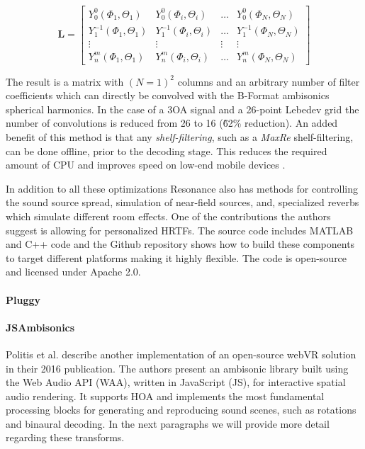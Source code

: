 \begin{equation}
\mathbf{L}=\left[\begin{array}{cccc}
Y_{0}^{0}\left(\Phi_{1}, \Theta_{1}\right) & Y_{0}^{0}\left(\Phi_{i}, \Theta_{i}\right) & \ldots & Y_{0}^{0}\left(\Phi_{N}, \Theta_{N}\right) \\
Y_{1}^{-1}\left(\Phi_{1}, \Theta_{1}\right) & Y_{1}^{-1}\left(\Phi_{i}, \Theta_{i}\right) & \ldots & Y_{1}^{-1}\left(\Phi_{N}, \Theta_{N}\right) \\
\vdots & \vdots & \vdots & \vdots \\
Y_{n}^{m}\left(\Phi_{1}, \Theta_{1}\right) & Y_{n}^{m}\left(\Phi_{i}, \Theta_{i}\right) & \ldots & Y_{n}^{m}\left(\Phi_{N}, \Theta_{N}\right)
\end{array}\right]
\label{eq:re-enc-mat}
\end{equation}

The result is a matrix with $(N=1)^2$ columns and an arbitrary number of filter coefficients which can directly be convolved with the B-Format ambisonics spherical harmonics. In the case of a 3OA signal and a 26-point Lebedev grid the number of convolutions is reduced from 26 to 16 (\~62\% reduction). An added benefit of this method is that any \textit{shelf-filtering}, such as a \textit{MaxRe} shelf-filtering, can be done offline, prior to the decoding stage. This reduces the required amount of CPU and improves speed on low-end mobile devices \cite{gorzel2019efficient}.

In addition to all these optimizations Resonance also has methods for controlling the sound source spread, simulation of near-field sources, and, specialized reverbs which simulate different room effects. One of the contributions the authors suggest is allowing for personalized HRTFs. The source code includes MATLAB and C++ code and the Github repository shows how to build these components to target different platforms making it highly flexible. The code is open-source and licensed under Apache 2.0. 

\paragraph{Pluggy}

\paragraph{JSAmbisonics}

Politis et al. \cite{politis2016jsambisonics} describe another implementation of an open-source webVR solution in their 2016 publication. The authors present an ambisonic library built using the Web Audio API (WAA), written in JavaScript (JS), for interactive spatial audio rendering. It supports HOA and implements the most fundamental processing blocks for generating and reproducing sound scenes, such as rotations and binaural decoding. In the next paragraphs we will provide more detail regarding these transforms. 

